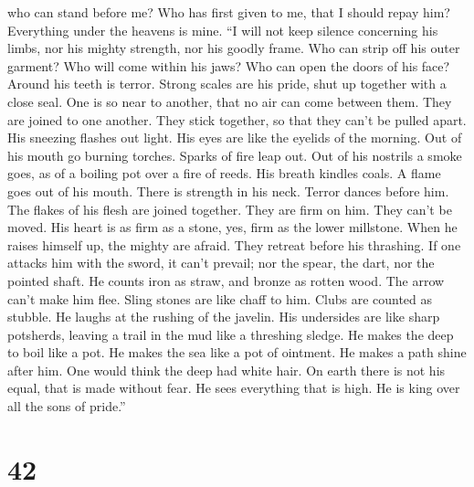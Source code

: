 who can stand before me?  Who has first given to me, that I
should repay him? Everything under the heavens is mine. 
``I will not keep silence concerning his limbs, nor his mighty strength,
nor his goodly frame.  Who can strip off his outer garment?
Who will come within his jaws?  Who can open the doors of
his face? Around his teeth is terror.  Strong scales are
his pride, shut up together with a close seal.  One is so
near to another, that no air can come between them.  They
are joined to one another. They stick together, so that they can't be
pulled apart.  His sneezing flashes out light. His eyes are
like the eyelids of the morning.  Out of his mouth go
burning torches. Sparks of fire leap out.  Out of his
nostrils a smoke goes, as of a boiling pot over a fire of reeds.
 His breath kindles coals. A flame goes out of his mouth.
 There is strength in his neck. Terror dances before him.
 The flakes of his flesh are joined together. They are firm
on him. They can't be moved.  His heart is as firm as a
stone, yes, firm as the lower millstone.  When he raises
himself up, the mighty are afraid. They retreat before his thrashing.
 If one attacks him with the sword, it can't prevail; nor
the spear, the dart, nor the pointed shaft.  He counts iron
as straw, and bronze as rotten wood.  The arrow can't make
him flee. Sling stones are like chaff to him.  Clubs are
counted as stubble. He laughs at the rushing of the javelin.
 His undersides are like sharp potsherds, leaving a trail
in the mud like a threshing sledge.  He makes the deep to
boil like a pot. He makes the sea like a pot of ointment. 
He makes a path shine after him. One would think the deep had white
hair.  On earth there is not his equal, that is made
without fear.  He sees everything that is high. He is king
over all the sons of pride.''

\hypertarget{section-24}{%
\section{42}\label{section-24}}

